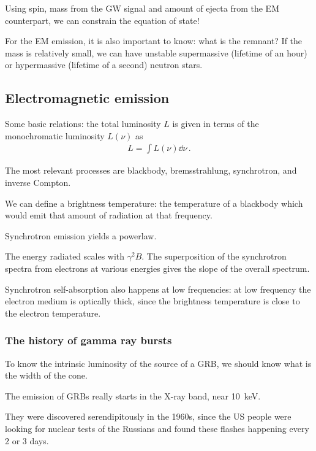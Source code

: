 \documentclass[main.tex]{subfiles}
\begin{document}
Using spin, mass from the GW signal and amount of ejecta from the EM counterpart, 
we can constrain the equation of state! 

For the EM emission, it is also important to know: what is the remnant? 
If the mass is relatively small, we can have unstable 
supermassive (lifetime of an hour) or hypermassive (lifetime of a second) neutron stars. 

\subsection{Electromagnetic emission}

Some basic relations: 
the total luminosity \(L\) is given in terms of the monochromatic luminosity \(L(\nu )\) as 
%
\begin{align}
L = \int L (\nu ) \dd{\nu }
\,.
\end{align}

The most relevant processes are blackbody, bremsstrahlung, synchrotron, and inverse Compton. 

We can define a brightness temperature: the temperature of a blackbody which would 
emit that amount of radiation at that frequency.


Synchrotron emission yields a powerlaw.


The energy radiated scales with \(\gamma^2 B\). 
The superposition of the synchrotron spectra from electrons at various energies 
gives the slope of the overall spectrum. 

Synchrotron self-absorption also happens at low frequencies: 
at low frequency the electron medium is optically thick, since the brightness temperature 
is close to the electron temperature. 

\subsubsection{The history of gamma ray bursts}

To know the intrinsic luminosity of the source of a GRB, we should 
know what is the width of the cone. 

The emission of GRBs really starts in the X-ray band, near \SI{10}{keV}. 

They were discovered serendipitously in the 1960s, since the US people 
were looking for nuclear tests of the Russians and found these flashes 
happening every 2 or 3 days. 
\end{document}
